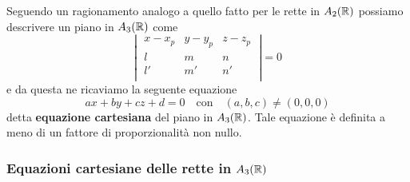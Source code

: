 Seguendo un ragionamento analogo a quello fatto per le rette in \(A_2(\RR )\) possiamo descrivere un piano in \(A_3(\RR )\) come \[
\left| \; \begin{matrix}
    x-x_p & y-y_p & z-z_p \\
    l & m & n \\
    l' & m' & n' \\
\end{matrix} \; \right| = 0
\] e da questa ne ricaviamo la seguente equazione \[
ax + by + cz + d = 0 \quad \text{con} \quad  (a,b,c) \neq (0,0,0)
\] detta \textbf{equazione cartesiana} del piano in \(A_3(\RR )\). Tale equazione è definita a meno di un fattore di proporzionalità non nullo.

\subsubsection{Equazioni cartesiane delle rette in \(A_3(\RR )\)}

